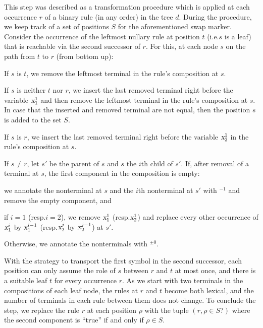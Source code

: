 \documentclass[../../document.tex]{subfiles}
\begin{document}
    This step was described as a transformation procedure which is applied at each occurrence \(r\) of a binary rule (in any order) in the tree \(d\).
    During the procedure, we keep track of a set of positions \(S\) for the aforementioned swap marker.
    Consider the occurrence of the leftmost nullary rule at position \(t\) (i.e.\@ \(s\) is a leaf) that is reachable via the second successor of \(r\).
    For this, at each node \(s\) on the path from \(t\) to \(r\) (from bottom up):
    \begin{compactitem}
        \item If \(s\) is \(t\), we remove the leftmost terminal in the rule's composition at \(s\).
        \item
            If \(s\) is neither \(t\) nor \(r\), we insert the last removed terminal right before the variable \(\textsl{x}^1_1\) and then remove the leftmost terminal in the rule's composition at \(s\).
            In case that the inserted and removed terminal are not equal, then the position \(s\) is added to the set \(S\).
        \item If \(s\) is \(r\), we insert the last removed terminal right before the variable \(\textsl{x}^1_2\) in the rule's composition at \(s\).
    \end{compactitem}
    If \(s \neq r\), let \(s'\) be the parent of $s$ and $s$ the \(i\)th child of $s'$.
    If, after removal of a terminal at \(s\), the first component in the composition is empty:
    \begin{compactitem}
        \item we annotate the  nonterminal at \(s\) and the \(i\)th  nonterminal at \(s'\) with $^{-1}$ and remove the empty component, and
        \item if \(i = 1\) (resp.\@ \(i = 2\)), we remove \(\textsl{x}^1_1\) (resp.\@ \(\textsl{x}_2^1\)) and replace every other occurrence of \(\textsl{x}_1^i\) by \(\textsl{x}_1^{i-1}\) (resp.\@ \(\textsl{x}_2^j\) by \(\textsl{x}_2^{j-1}\)) at $s'$.
    \end{compactitem}
    Otherwise, we annotate the nonterminals with \(^{\pm 0}\).

    With the strategy to transport the first symbol in the second successor, each position can only assume the role of \(s\) between \(r\) and \(t\) at most once, and there is a suitable leaf $t$ for every occurrence $r$.
    As we start with two terminals in the compositions of each leaf node, the rules at \(r\) and \(t\) become both lexical, and the number of terminals in each rule between them does not change.
    To conclude the step, we replace the rule \(r\) at each position \(\rho\) with the tuple \((r, \rho \in S?)\) where the second component is ``true'' if and only if \(\rho \in S\).
\end{document}
